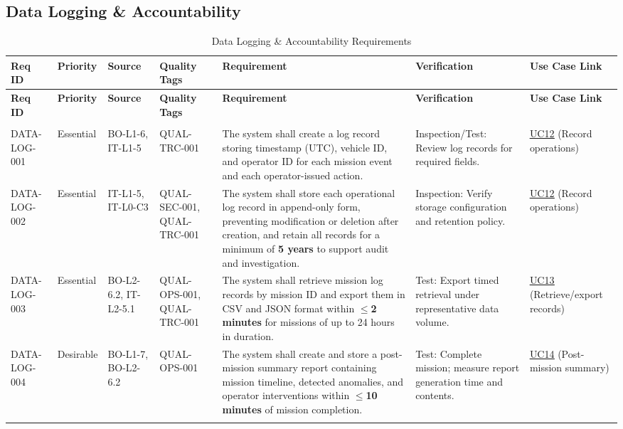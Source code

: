 \documentclass[11pt,a4paper]{article}
\let\orighyperref\hyperref
\renewcommand{\hyperref}[2][]{\orighyperref[#1]{\uline{#2}}}%
\begin{document}
\subsection{Data Logging \& Accountability}
\small
\renewcommand{\arraystretch}{1.2}
\setlength{\tabcolsep}{3pt}
\begin{longtable}{|>{\raggedright\arraybackslash}p{}|>{\raggedright\arraybackslash}p{}|>{\raggedright\arraybackslash}p{}|>{\raggedright\arraybackslash}p{}|>{\raggedright\arraybackslash}p{}|>{\raggedright\arraybackslash}p{}|>{\raggedright\arraybackslash}p{}|}
\hline
\rowcolor{tableheader}
\textbf{Req ID} & \textbf{Priority} & \textbf{Source} & \textbf{Quality Tags} & \textbf{Requirement} & \textbf{Verification} & \textbf{Use Case Link} \\
\hline
\endfirsthead
\hline
\rowcolor{tableheader}
\textbf{Req ID} & \textbf{Priority} & \textbf{Source} & \textbf{Quality Tags} & \textbf{Requirement} & \textbf{Verification} & \textbf{Use Case Link} \\
\hline
\endhead
\hline \multicolumn{7}{r}{{Continued on next page}} \\ \hline
\endfoot
\hline
\endlastfoot

DATA-LOG-001 & Essential & BO-L1-6, IT-L1-5 & QUAL-TRC-001 & The system shall create a log record storing timestamp (UTC), vehicle ID, and operator ID for each mission event and each operator-issued action. & Inspection/Test: Review log records for required fields. & \hyperref[fig:usecase-diagram-pdf]{UC12} (Record operations) \\
\hline
DATA-LOG-002 & Essential & IT-L1-5, IT-L0-C3 & QUAL-SEC-001, QUAL-TRC-001 & The system shall store each operational log record in append-only form, preventing modification or deletion after creation, and retain all records for a minimum of \textbf{5 years} to support audit and investigation. & Inspection: Verify storage configuration and retention policy. & \hyperref[fig:usecase-diagram-pdf]{UC12} (Record operations) \\
\hline
DATA-LOG-003 & Essential & BO-L2-6.2, IT-L2-5.1 & QUAL-OPS-001, QUAL-TRC-001 & The system shall retrieve mission log records by mission ID and export them in CSV and JSON format within \(\leq\)\textbf{2 minutes} for missions of up to 24 hours in duration. & Test: Export timed retrieval under representative data volume. & \hyperref[fig:usecase-diagram-pdf]{UC13} (Retrieve/export records) \\
\hline
DATA-LOG-004 & Desirable & BO-L1-7, BO-L2-6.2 & QUAL-OPS-001 & The system shall create and store a post-mission summary report containing mission timeline, detected anomalies, and operator interventions within \(\leq\)\textbf{10 minutes} of mission completion. & Test: Complete mission; measure report generation time and contents. & \hyperref[fig:usecase-diagram-pdf]{UC14} (Post-mission summary) \\
\hline
\caption{Data Logging \& Accountability Requirements}\label{tab:req-data}
\end{longtable}
\setlength{\tabcolsep}{6pt}
\normalsize
\end{document}
